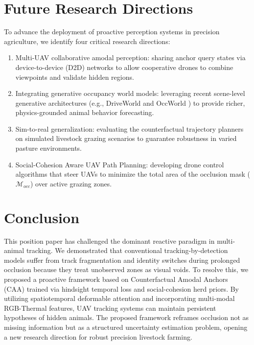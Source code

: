 \documentclass[10pt,conference,letterpaper,twocolumn]{article}
\begin{document}
\section{Future Research Directions}
To advance the deployment of proactive perception systems in precision agriculture, we identify four critical research directions:
\begin{enumerate}
    \item Multi-UAV collaborative amodal perception: sharing anchor query states via device-to-device (D2D) networks to allow cooperative drones to combine viewpoints and validate hidden regions.
    \item Integrating generative occupancy world models: leveraging recent scene-level generative architectures (e.g., DriveWorld \cite{min2024driveworld} and OccWorld \cite{zheng2024occworld}) to provide richer, physics-grounded animal behavior forecasting.
    \item Sim-to-real generalization: evaluating the counterfactual trajectory planners on simulated livestock grazing scenarios to guarantee robustness in varied pasture environments.
    \item Social-Cohesion Aware UAV Path Planning: developing drone control algorithms that steer UAVs to minimize the total area of the occlusion mask ($\mathcal{M}_{occ}$) over active grazing zones.
\end{enumerate}

\section{Conclusion}
This position paper has challenged the dominant reactive paradigm in multi-animal tracking. We demonstrated that conventional tracking-by-detection models suffer from track fragmentation and identity switches during prolonged occlusion because they treat unobserved zones as visual voids. To resolve this, we proposed a proactive framework based on Counterfactual Amodal Anchors (CAA) trained via hindsight temporal loss and social-cohesion herd priors. By utilizing spatiotemporal deformable attention and incorporating multi-modal RGB-Thermal features, UAV tracking systems can maintain persistent hypotheses of hidden animals. The proposed framework reframes occlusion not as missing information but as a structured uncertainty estimation problem, opening a new research direction for robust precision livestock farming.
\end{document}
